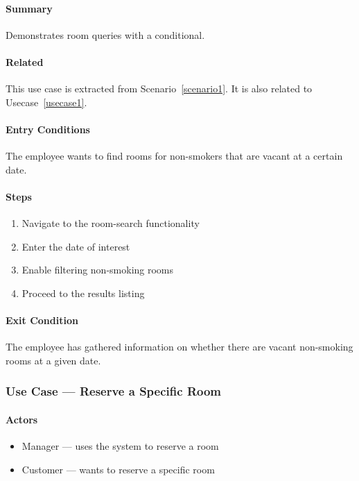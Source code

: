 \paragraph{Summary}

Demonstrates room queries with a conditional.

\paragraph{Related}
This use case is extracted from Scenario~\ref{scenario1}.
It is also related to Usecase~\ref{usecase1}.

\paragraph{Entry Conditions}

The employee wants to find rooms for non-smokers that are vacant at a
certain date.

\paragraph{Steps}

\begin{enumerate}
\def\labelenumi{\arabic{enumi}.}
\tightlist
\item
  Navigate to the room-search functionality
\item
  Enter the date of interest
\item
  Enable filtering non-smoking rooms
\item
  Proceed to the results listing
\end{enumerate}

\paragraph{Exit Condition}

The employee has gathered information on whether there are vacant
non-smoking rooms at a given date.

\subsubsection{Use Case --- Reserve a Specific Room}\label{usecase3}

\paragraph{Actors}

\begin{itemize}
\tightlist
\item
  Manager --- uses the system to reserve a room
\item
  Customer --- wants to reserve a specific room
\end{itemize}

